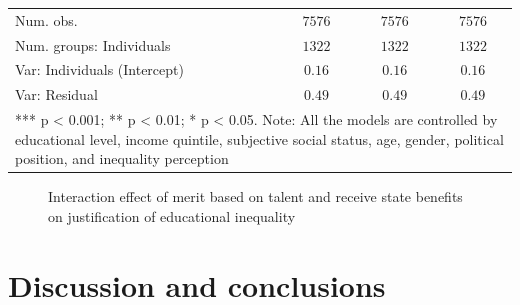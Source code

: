 \documentclass[
  12pt,
  10pt]{article}
\begin{document}
\begin{table}
{\begin{center}
{\begin{tabular}{l c c c}
Num. obs.                              & $7576$       & $7576$       & $7576$       \\
Num. groups: Individuals               & $1322$       & $1322$       & $1322$       \\
Var: Individuals (Intercept)           & $0.16$       & $0.16$       & $0.16$       \\
Var: Residual                          & $0.49$       & $0.49$       & $0.49$       \\
\bottomrule
\multicolumn{4}{l}{\scriptsize{*** p < 0.001; ** p < 0.01; * p < 0.05. 
Note: All the models are controlled by educational level, income quintile, subjective social status, age, gender, political position, and inequality perception}}
\end{tabular}
}
\label{table:coefficients}
\end{center}

}

\end{table}%

\begin{figure}[H]


\caption{\label{fig-interact-talent}Interaction effect of merit based on
talent and receive state benefits on justification of educational
inequality}

\end{figure}%

\section{Discussion and conclusions}\label{discussion-and-conclusions}
\end{document}
